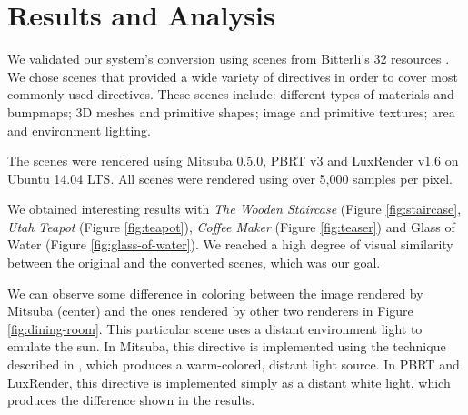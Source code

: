 \section{Results and Analysis}
We validated our system's conversion using scenes from Bitterli's 32 resources 
\cite{resources16}. We chose scenes that provided a wide variety of directives 
in order to cover most commonly used directives. These scenes include: different 
types of materials and bumpmaps; 3D meshes and primitive shapes; image and 
primitive textures; area and environment lighting. 

The scenes were rendered using Mitsuba 0.5.0, PBRT v3 and LuxRender v1.6 on 
Ubuntu 14.04 LTS. All scenes were rendered using over 5,000 samples per pixel. 

We obtained interesting results with \textit{The Wooden Staircase} (Figure 
\ref{fig:staircase}, \textit{Utah Teapot} (Figure \ref{fig:teapot}), 
\textit{Coffee Maker} (Figure \ref{fig:teaser}) and Glass of Water (Figure 
\ref{fig:glass-of-water}). We reached a high degree of visual similarity between 
the original and the converted scenes, which was our goal.

We can observe some difference in coloring between the image rendered by Mitsuba 
(center) and the ones rendered by other two renderers in Figure 
\ref{fig:dining-room}. This particular scene uses a distant environment light to 
emulate the sun. In Mitsuba, this directive is implemented using the technique 
described in \cite{Preetham}, which produces a warm-colored, distant light source. In 
PBRT and LuxRender, this directive is implemented simply as a distant white 
light, which produces the difference shown in the results.

